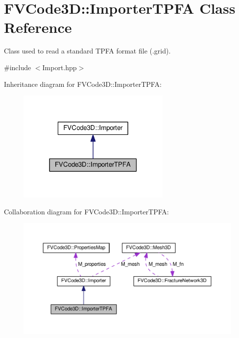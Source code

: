 \hypertarget{classFVCode3D_1_1ImporterTPFA}{}\section{F\+V\+Code3D\+:\+:Importer\+T\+P\+FA Class Reference}
\label{classFVCode3D_1_1ImporterTPFA}


Class used to read a standard T\+P\+FA format file (.grid).  




{\ttfamily \#include $<$Import.\+hpp$>$}



Inheritance diagram for F\+V\+Code3D\+:\+:Importer\+T\+P\+FA\+:
\nopagebreak
\begin{figure}[H]
\begin{center}
\leavevmode
\includegraphics[width=213pt]{classFVCode3D_1_1ImporterTPFA__inherit__graph}
\end{center}
\end{figure}


Collaboration diagram for F\+V\+Code3D\+:\+:Importer\+T\+P\+FA\+:
\nopagebreak
\begin{figure}[H]
\begin{center}
\leavevmode
\includegraphics[width=350pt]{classFVCode3D_1_1ImporterTPFA__coll__graph}
\end{center}
\end{figure}
